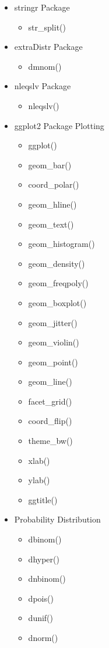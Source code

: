 \documentclass{article}
\begin{document}
\begin{multicols}{3}
\begin{itemize}
    \item stringr Package
  \begin{itemize}
    \item str\_split()
  \end{itemize}
    \item extraDistr Package
  \begin{itemize}
    \item dmnom()
  \end{itemize}
    \item nleqslv Package
  \begin{itemize}
    \item nleqslv()
  \end{itemize}
  \vfill\null \columnbreak
  \item ggplot2 Package Plotting
  \begin{itemize}
    \item ggplot()
    \item geom\_bar()
    \item coord\_polar()
    \item geom\_hline()
    \item geom\_text()
    \item geom\_histogram()
    \item geom\_density()
    \item geom\_freqpoly()
    \item geom\_boxplot()
    \item geom\_jitter()
    \item geom\_violin()
    \item geom\_point()
    \item geom\_line()
    \item facet\_grid()
    \item coord\_flip()
    \item theme\_bw()
    \item xlab()
    \item ylab()
    \item ggtitle()
  \end{itemize}
  \item Probability Distribution
  \begin{itemize}
    \item dbinom()
    \item dhyper()
    \item dnbinom()
    \item dpois()
    \item dunif()
    \item dnorm()

\end{itemize}
\end{itemize}
\end{multicols}
\end{document}
